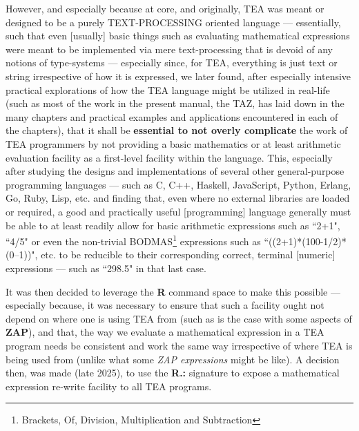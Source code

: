 \documentclass[a4paper, 18pt]{book} %
\begin{document}
{{{However, and especially because at core, and originally, TEA was meant or designed to be a purely TEXT-PROCESSING oriented language --- essentially, such that even [usually] basic things such as evaluating mathematical expressions were meant to be implemented via mere text-processing that is devoid of any notions of type-systems --- especially since, for TEA, everything is just text or string irrespective of how it is expressed, we later found, after especially intensive practical explorations of how the TEA language might be utilized in real-life (such as most of the work in the present manual, the TAZ, has laid down in the many chapters and practical examples and applications encountered in each of the chapters), that it shall be \textbf{essential to not overly complicate} the work of TEA programmers by not providing a basic mathematics or at least arithmetic evaluation facility as a first-level facility within the language. This, especially after studying the designs and implementations of several other general-purpose programming languages --- such as C, C++, Haskell, JavaScript, Python, Erlang, Go, Ruby, Lisp, etc. and finding that, even where no external libraries are loaded or required, a good and practically useful [programming] language generally must be able to at least readily allow for basic arithmetic expressions such as ``2+1", ``4/5" or even the non-trivial BODMAS\footnote{Brackets, Of, Division, Multiplication and Subtraction} expressions such as ``((2+1)*(100-1/2)*(0--1))", etc. to be reducible to their corresponding correct, terminal [numeric] expressions --- such as ``298.5" in that last case.

\vspace{2em}

It was then decided to leverage the \textbf{R} command space to make this possible --- especially because, it was necessary to ensure that such a facility ought not depend on where one is using TEA from (such as is the case with some aspects of \textbf{ZAP}), and that, the way we evaluate a mathematical expression in a TEA program needs be consistent and work the same way irrespective of where TEA is being used from (unlike what some \textit{ZAP expressions} might be like). A decision then, was made (late 2025), to use the \textbf{R.:} signature to expose a mathematical expression re-write facility to all TEA programs. 


\vspace{2em}

}}}
\end{document}
